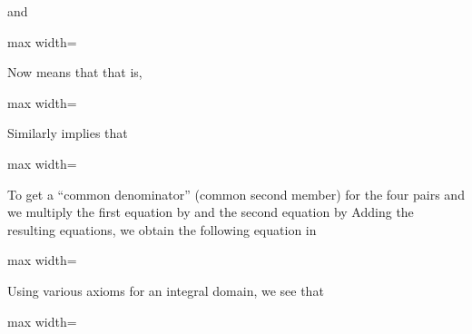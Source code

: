 \documentclass[11pt,oneside]{article}
\begin{document}
\begin{BookBody}
\noindent and

\begin{center}\begin{adjustbox}{max width=\linewidth}\end{adjustbox}\end{center}

\noindent Now  means that  that is,

\begin{center}\begin{adjustbox}{max width=\linewidth}\end{adjustbox}\end{center}

\noindent Similarly implies that

\begin{center}\begin{adjustbox}{max width=\linewidth}\end{adjustbox}\end{center}

\noindent To get a “common denominator” (common second member) for the four pairs   and  we multiply the first equation by  and the second equation by  Adding the resulting equations, we obtain the following equation in 

\begin{center}\begin{adjustbox}{max width=\linewidth}\end{adjustbox}\end{center}

\noindent Using various axioms for an integral domain, we see that

\begin{center}\begin{adjustbox}{max width=\linewidth}\end{adjustbox}\end{center}


\end{BookBody}
\end{document}
